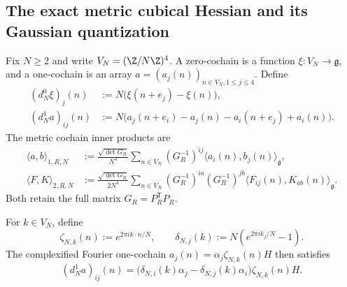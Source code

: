 \subsection{The exact metric cubical Hessian and its Gaussian quantization}

Fix \(N\ge2\) and write \(V_N=(\Z/N\Z)^4\).  A zero-cochain is a function
\(\xi:V_N\to\mathfrak g\), and a one-cochain is an array
\(a=(a_j(n))_{n\in V_N,1\le j\le4}\).  Define
\begin{align}
 (d_N^0\xi)_j(n)
 &:=N\bigl(\xi(n+e_j)-\xi(n)\bigr),
 \label{eq:s6cusp-discrete-d-zero}\\
 (d_N^1a)_{ij}(n)
 &:=N\bigl(
 a_j(n+e_i)-a_j(n)
 -a_i(n+e_j)+a_i(n)
 \bigr).
 \label{eq:s6cusp-discrete-d-one}
\end{align}
The metric cochain inner products are
\begin{align}
 \langle a,b\rangle_{1,R,N}
 &:=
 \frac{\sqrt{\det G_R}}{N^4}
 \sum_{n\in V_N}
 (G_R^{-1})^{ij}
 \langle a_i(n),b_j(n)\rangle_{\mathfrak g},
 \label{eq:s6cusp-one-cochain-inner-product}\\
 \langle F,K\rangle_{2,R,N}
 &:=
 \frac{\sqrt{\det G_R}}{2N^4}
 \sum_{n\in V_N}
 (G_R^{-1})^{ia}(G_R^{-1})^{jb}
 \langle F_{ij}(n),K_{ab}(n)\rangle_{\mathfrak g}.
 \label{eq:s6cusp-two-cochain-inner-product}
\end{align}
Both retain the full matrix \(G_R=P_R^{\mathsf T}P_R\).

For \(k\in V_N\), define
\begin{equation}\label{eq:s6cusp-discrete-fourier-symbol}
 \zeta_{N,k}(n):=e^{2\pi i k\cdot n/N},
 \qquad
 \delta_{N,j}(k):=N\left(e^{2\pi i k_j/N}-1\right).
\end{equation}
The complexified Fourier one-cochain
\(a_j(n)=\alpha_j\zeta_{N,k}(n)H\) then satisfies
\begin{equation}\label{eq:s6cusp-discrete-curvature-symbol}
 (d_N^1a)_{ij}(n)=
 \bigl(\delta_{N,i}(k)\alpha_j
 -\delta_{N,j}(k)\alpha_i\bigr)
 \zeta_{N,k}(n)H.
\end{equation}

